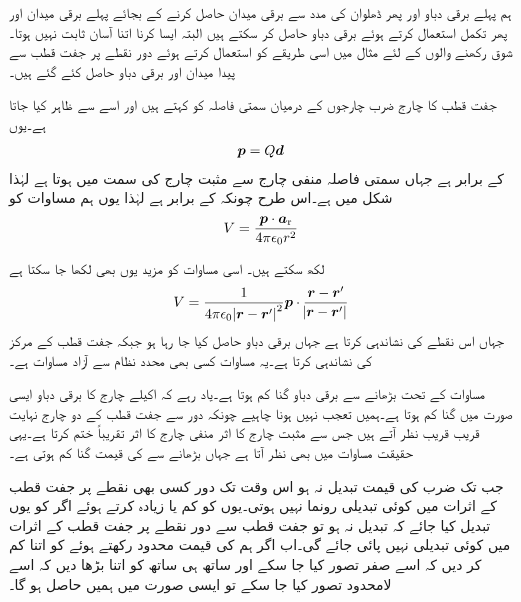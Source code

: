 ہم پہلے برقی دباو اور پھر ڈھلوان کی مدد سے برقی میدان حاصل کرنے کے بجائے پہلے برقی میدان اور پھر تکمل استعمال کرتے ہوئے برقی دباو حاصل کر سکتے ہیں البتہ ایسا کرنا اتنا آسان ثابت نہیں ہوتا۔شوق رکھنے والوں کے لئے مثال  میں اسی طریقے کو استعمال کرتے ہوئے دور نقطے پر جفت قطب  سے پیدا میدان اور برقی دباو حاصل کئے گئے ہیں۔

جفت قطب کا چارج  ضرب چارجوں کے درمیان سمتی فاصلہ  کو   کہتے ہیں اور اسے  سے ظاہر کیا جاتا ہے۔یوں 
\begin{align}\label{مساوات_توانائی_سمتی_جفت_قطب}
{\ensuremath{{\boldsymbol{p}}}}=Q {{\boldsymbol{d}}}
\end{align}
کے برابر ہے جہاں سمتی فاصلہ منفی چارج سے مثبت چارج کی سمت میں ہوتا ہے لہٰذا شکل  میں  ہے۔اس طرح چونکہ  کے برابر ہے لہٰذا یوں ہم مساوات  کو
\begin{align}
V=\frac{{{\boldsymbol{p}}} \cdot {\boldsymbol{a}}_{\textup{r}}}{4 \pi \epsilon_0 r^2}
\end{align} 

لکھ سکتے ہیں۔ اسی مساوات کو مزید یوں بھی لکھا جا سکتا ہے
\begin{align}
V=\frac{1}{4\pi \epsilon_0 \abs{{{\boldsymbol{r}}}-{{\boldsymbol{r}}}'}^2} {{\boldsymbol{p}}} \cdot \frac{{{\boldsymbol{r}}}-{{\boldsymbol{r}}}'}{\abs{{{\boldsymbol{r}}}-{{\boldsymbol{r}}}'}}
\end{align}
جہاں  اس نقطے کی نشاندہی کرتا ہے جہاں برقی دباو حاصل کیا جا رہا ہو جبکہ  جفت قطب کے مرکز کی نشاندہی کرتا ہے۔یہ مساوات کسی بھی محدد نظام سے آزاد مساوات ہے۔

مساوات  کے تحت  بڑھانے سے  برقی دباو  گنا کم ہوتا ہے۔یاد رہے کہ اکیلے چارج کا برقی دباو ایسی صورت میں  گنا کم ہوتا ہے۔ہمیں تعجب نہیں ہونا چاہیے چونکہ دور سے جفت قطب کے دو چارج نہایت قریب قریب نظر آتے ہیں جس سے مثبت چارج کا اثر منفی چارج کا اثر تقریباً ختم کرتا ہے۔یہی حقیقت مساوات  میں بھی نظر آتا ہے جہاں  بڑھانے سے   کی قیمت  گنا کم ہوتی ہے۔

جب تک  ضرب  کی قیمت تبدیل نہ ہو اس وقت تک دور کسی بھی نقطے پر جفت قطب کے اثرات میں کوئی تبدیلی رونما نہیں ہوتی۔یوں  کو کم  یا زیادہ کرتے ہوئے اگر  کو یوں تبدیل کیا جائے کہ  تبدیل نہ ہو تو جفت قطب سے دور نقطے پر جفت قطب کے اثرات میں کوئی تبدیلی نہیں پائی جائے گی۔اب اگر  ہم  کی قیمت محدود رکھتے ہوئے   کو اتنا کم کر دیں کہ اسے صفر تصور  کیا جا سکے  اور ساتھ ہی ساتھ  کو اتنا بڑھا دیں کہ اسے لامحدود تصور کیا جا سکے  تو ایسی صورت میں ہمیں  حاصل ہو گا۔


